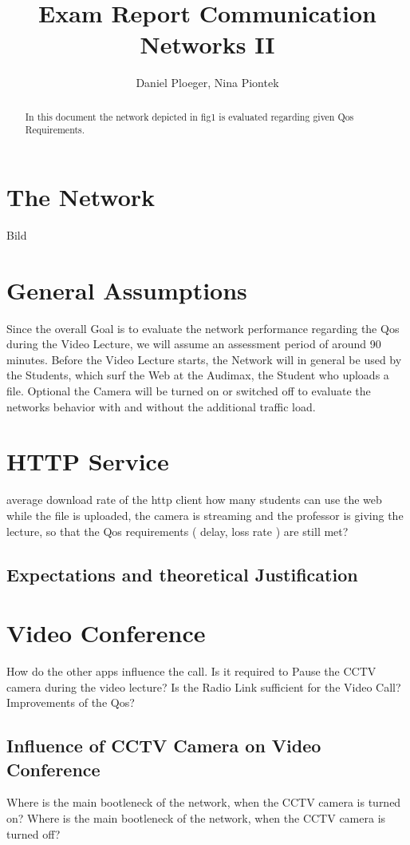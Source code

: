 \documentclass[a4paper,10pt]{report}
\title{Exam Report Communication Networks II}
\author{Daniel Ploeger, Nina Piontek}
\begin{document}
\maketitle

\begin{abstract}
In this document the network depicted in fig1 is evaluated regarding given Qos Requirements.
\end{abstract}

\section{The Network}
Bild
\section{General Assumptions}
Since the overall Goal is to evaluate the network performance regarding the Qos during the Video Lecture, we will assume an assessment period
of around 90 minutes. Before the Video Lecture starts, the Network will in general be used by the Students, which surf the Web at the Audimax, the Student 
who uploads a file. Optional the Camera will be turned on or switched off to evaluate the networks behavior with and without the additional
traffic load.
\section{HTTP Service}
average download rate of the http client
how many students can use the web while the file is uploaded, the camera is streaming and the professor is giving the lecture, so that the
Qos  requirements ( delay, loss rate ) are still met?
\subsection{Expectations and theoretical Justification}
\section{Video Conference}
How do  the other apps influence the call.
Is it required to Pause the CCTV camera during the video lecture?
Is the Radio Link sufficient for the Video Call? Improvements of the Qos?
\subsection{Influence of CCTV Camera on Video Conference}
Where is the main bootleneck of the network, when the CCTV camera is turned on?
Where is the main bootleneck of the network, when the CCTV camera is turned off?
\end{document}
